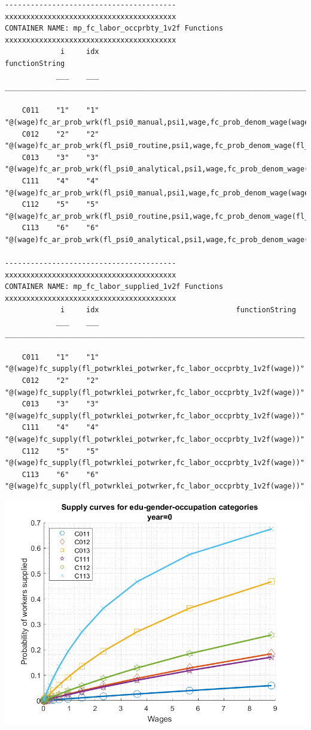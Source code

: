 \documentclass[
]{book}
\begin{document}
\begin{verbatim}
----------------------------------------
xxxxxxxxxxxxxxxxxxxxxxxxxxxxxxxxxxxxxxxx
CONTAINER NAME: mp_fc_labor_occprbty_1v2f Functions
xxxxxxxxxxxxxxxxxxxxxxxxxxxxxxxxxxxxxxxx
             i     idx                                          functionString                                      
            ___    ___    __________________________________________________________________________________________

    C011    "1"    "1"    "@(wage)fc_ar_prob_wrk(fl_psi0_manual,psi1,wage,fc_prob_denom_wage(wage,fl_w2,fl_w3))"    
    C012    "2"    "2"    "@(wage)fc_ar_prob_wrk(fl_psi0_routine,psi1,wage,fc_prob_denom_wage(fl_w1,wage,fl_w3))"   
    C013    "3"    "3"    "@(wage)fc_ar_prob_wrk(fl_psi0_analytical,psi1,wage,fc_prob_denom_wage(fl_w1,fl_w2,wage))"
    C111    "4"    "4"    "@(wage)fc_ar_prob_wrk(fl_psi0_manual,psi1,wage,fc_prob_denom_wage(wage,fl_w2,fl_w3))"    
    C112    "5"    "5"    "@(wage)fc_ar_prob_wrk(fl_psi0_routine,psi1,wage,fc_prob_denom_wage(fl_w1,wage,fl_w3))"   
    C113    "6"    "6"    "@(wage)fc_ar_prob_wrk(fl_psi0_analytical,psi1,wage,fc_prob_denom_wage(fl_w1,fl_w2,wage))"

----------------------------------------
xxxxxxxxxxxxxxxxxxxxxxxxxxxxxxxxxxxxxxxx
CONTAINER NAME: mp_fc_labor_supplied_1v2f Functions
xxxxxxxxxxxxxxxxxxxxxxxxxxxxxxxxxxxxxxxx
             i     idx                                functionString                            
            ___    ___    ______________________________________________________________________

    C011    "1"    "1"    "@(wage)fc_supply(fl_potwrklei_potwrker,fc_labor_occprbty_1v2f(wage))"
    C012    "2"    "2"    "@(wage)fc_supply(fl_potwrklei_potwrker,fc_labor_occprbty_1v2f(wage))"
    C013    "3"    "3"    "@(wage)fc_supply(fl_potwrklei_potwrker,fc_labor_occprbty_1v2f(wage))"
    C111    "4"    "4"    "@(wage)fc_supply(fl_potwrklei_potwrker,fc_labor_occprbty_1v2f(wage))"
    C112    "5"    "5"    "@(wage)fc_supply(fl_potwrklei_potwrker,fc_labor_occprbty_1v2f(wage))"
    C113    "6"    "6"    "@(wage)fc_supply(fl_potwrklei_potwrker,fc_labor_occprbty_1v2f(wage))"
\end{verbatim}

\includegraphics[width=5.20833in,height=\textheight]{img/bfwx_mlogit_images/figure_0.png}
\end{document}
